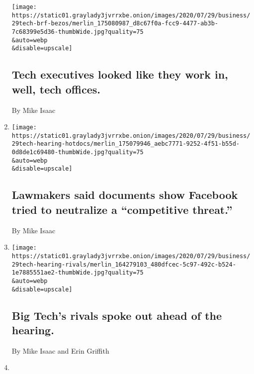 \begin{enumerate}
  \texttt{[image: https://static01.graylady3jvrrxbe.onion/images/2020/07/29/business/29tech-brf-bezos/merlin\_175080987\_d8c67f0a-fcc9-4477-ab3b-7c68399e5d36-thumbWide.jpg?quality=75\\\&auto=webp\\\&disable=upscale]}

  \hypertarget{tech-executives-looked-like-they-work-in-well-tech-offices}{%
  \subsection{Tech executives looked like they work in, well, tech
  offices.}\label{tech-executives-looked-like-they-work-in-well-tech-offices}}

  By Mike Isaac
\item
  \href{/live/2020/07/29/technology/tech-ceos-hearing-testimony/lawmakers-said-documents-show-facebook-tried-to-neutralize-a-competitive-threat}{}

  \texttt{[image: https://static01.graylady3jvrrxbe.onion/images/2020/07/29/business/29tech-hearing-hotdocs/merlin\_175079946\_aebc7771-9252-4f51-b55d-0d8de1c69480-thumbWide.jpg?quality=75\\\&auto=webp\\\&disable=upscale]}

  \hypertarget{lawmakers-said-documents-show-facebook-tried-to-neutralize-a-competitive-threat}{%
  \subsection{Lawmakers said documents show Facebook tried to neutralize
  a ``competitive
  threat.''}\label{lawmakers-said-documents-show-facebook-tried-to-neutralize-a-competitive-threat}}

  By Mike Isaac
\item
  \href{/live/2020/07/29/technology/tech-ceos-hearing-testimony/big-techs-rivals-spoke-out-ahead-of-the-hearing}{}

  \texttt{[image: https://static01.graylady3jvrrxbe.onion/images/2020/07/29/business/29tech-hearing-rivals/merlin\_164279103\_480dfcec-5c97-492c-b524-1e7885551ae2-thumbWide.jpg?quality=75\\\&auto=webp\\\&disable=upscale]}

  \hypertarget{big-techs-rivals-spoke-out-ahead-of-the-hearing}{%
  \subsection{Big Tech's rivals spoke out ahead of the
  hearing.}\label{big-techs-rivals-spoke-out-ahead-of-the-hearing}}

  By Mike Isaac and Erin Griffith
\item
  \href{/2020/07/29/technology/tech-ceos-congress-what-to-know.html}{}


\end{enumerate}
